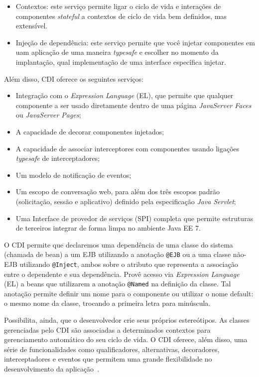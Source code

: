 \begin{itemize}
	\item Contextos: este serviço permite ligar o ciclo de vida e interações de componentes \textit{stateful} a contextos de ciclo de vida bem definidos, mas extensível.
	
	\item Injeção de dependência: este serviço permite que você injetar componentes em uam aplicação de uma maneira \textit{typesafe} e escolher no momento da implantação, qual implementação de uma interface específica injetar.
\end{itemize}

Além disso, CDI oferece os seguintes serviços:

\begin{itemize}
	\item Integração com o \textit{Expression Language} (EL), que permite que qualquer componente a ser usado diretamente dentro de uma página \textit{JavaServer Faces} ou \textit{JavaServer Pages};
	\item A capacidade de decorar componentes injetados;
	\item A capacidade de associar interceptores com componentes usando ligações \textit{typesafe} de interceptadores;
	\item Um modelo de notificação de eventos;
	\item Um escopo de conversação web, para além dos três escopos padrão (solicitação, sessão e aplicativo) definido pela especificação \textit{Java Servlet};
	\item Uma Interface de provedor de serviços (SPI) completa que permite estruturas de terceiros integrar de forma limpa no ambiente Java EE 7.
\end{itemize}

O CDI permite que declaremos uma dependência de uma classe do sistema (chamada de bean) a um EJB utilizando a anotação \texttt{@EJB} ou a uma classe não-EJB utilizando \texttt{@Inject}, ambos sobre o atributo que representa a associação entre o dependente e sua dependência. Provê acesso via \textit{Expression Language} (EL) a beans que utilizarem a anotação \texttt{@Named} na definição da classe. Tal anotação permite definir um nome para o componente ou utilizar o nome default: o mesmo nome da classe, trocando a primeira letra para minúscula. 

Possibilita, ainda, que o desenvolvedor crie seus próprios estereótipos. As classes gerenciadas pelo CDI são associadas a determinados contextos para gerenciamento automático do seu ciclo de vida. O CDI oferece, além disso, uma série de funcionalidades como qualificadores, alternativas, decoradores, interceptadores e eventos que permitem uma grande flexibilidade no desenvolvimento da aplicação~\cite{devmediacdi}.
